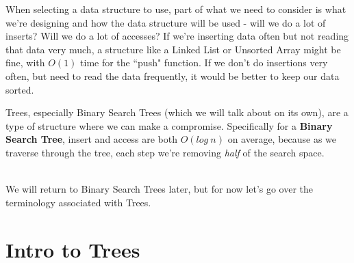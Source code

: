 \documentclass[a4paper,12pt,oneside]{book}
\begin{document}
{    When selecting a data structure to use, part of what we need to consider
    is what we're designing and how the data structure will be used -
    will we do a lot of inserts? Will we do a lot of accesses?
    If we're inserting data often but not reading that data very much,
    a structure like a Linked List or Unsorted Array might be fine,
    with $O(1)$ time for the ``push" function. If we don't do
    insertions very often, but need to read the data frequently,
    it would be better to keep our data sorted.

    \begin{center}
    \end{center}

    Trees, especially Binary Search Trees (which we will talk about on its own),
    are a type of structure where we can make a compromise. Specifically
    for a \textbf{Binary Search Tree}, insert and access are both $O(log\ n)$
    on average, because as we traverse through the tree, each step we're
    removing \textit{half} of the search space.

    ~\\
    We will return to Binary Search Trees later, but for now let's go
    over the terminology associated with Trees.

    \section{Intro to Trees}

}
\end{document}
